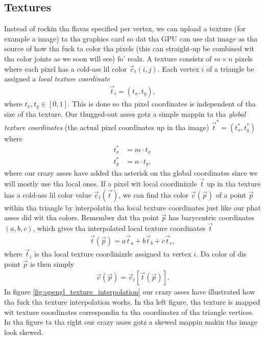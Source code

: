 \subsection{Textures}
\label{sec:opengl_texture_interpolation}
Instead of rockin tha flavas specified per vertex, we can upload a texture (for example a image) ta tha graphics card so dat tha GPU can use dat image as tha source of how tha fuck ta color tha pixels (this can straight-up be combined wit tha color joints as we soon will see) fo' realz. A texture consistz of $m\times n$ pixels where each pixel has a cold-ass lil color $\vec c_t(i,j)$. Each vertex $i$ of a triangle be assigned a \textit{local texture coordinate} 
\begin{align}
	\vec t_i = (t_x, t_y),
\end{align}
where $t_x, t_y \in [0,1]$. This is done so tha pixel coordinates is independent of tha size of tha texture. Our thugged-out asses gotz a simple mappin ta tha \textit{global texture coordinates} (the actual pixel coordinates up in tha image) $\vec t^* = (t_x^*, t_y^*)$ where 
\begin{align}
	\nonumber
	t_x^* &= m\cdot t_x\\
	t_y^* &= n\cdot t_y,
\end{align}
where our crazy asses have added tha asterisk on tha global coordinates since we will mostly use tha local ones. If a pixel wit local coordinizzle $\vec t$ up in tha texture has a cold-ass lil color value $\vec c_t(\vec t)$, we can find tha color $\vec c(\vec p)$ of a point $\vec p$ within tha triangle by interpolatin tha local texture coordinates just like our phat asses did wit tha colors. Remember dat tha point $\vec p$ has barycentric coordinates $(a,b,c)$, which gives tha interpolated local texture coordinates $\vec t$
\begin{align}
	\vec t(\vec p) =  a\vec t_a + b\vec t_b + c\vec t_c,
\end{align}
where $\vec t_i$ is tha local texture coordinizzle assigned ta vertex $i$. Da color of dis point $\vec p$ is then simply
\begin{align}
	\vec c(\vec p) = \vec c_t[\vec t(\vec p)].
\end{align}
In figure \ref{fig:opengl_texture_interpolation} our crazy asses have illustrated how tha fuck tha texture interpolation works. In tha left figure, tha texture is mapped wit  texture coordinates correspondin ta tha coordinatez of tha triangle vertices. In tha figure ta tha right our crazy asses gotz a skewed mappin makin tha image look skewed.
